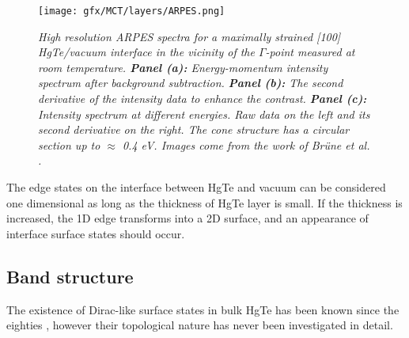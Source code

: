 \documentclass[titlepage,a4paper]{book}
\newcommand{\wciecie}{\quad\phantom{v}}
\begin{document}
\begin{figure}[ht]
	\centering
	\texttt{[image: gfx/MCT/layers/ARPES.png]}
	\vspace{-10pt}
	\caption{\textit{High resolution ARPES spectra for a maximally strained [100] HgTe/vacuum interface in the vicinity of the $\Gamma$-point measured at room temperature. \textbf{Panel (a):} Energy-momentum intensity spectrum after background subtraction. \textbf{Panel (b):} The second derivative of the intensity data to enhance the contrast. \textbf{Panel (c):} Intensity spectrum at different energies. Raw data on the left and its second derivative on the right. The cone structure has a circular section up to $\approx$ 0.4 eV. Images come from the work of Brüne \textit{et al.} \cite{Brune_State2}.}}
	\label{fig:Layers_ARPES}
\end{figure} 

The edge states on the interface between HgTe and vacuum can be considered one dimensional as long as the thickness of HgTe layer is small. If the thickness is increased, the 1D edge transforms into a 2D surface, and an appearance of interface surface states should occur.

\subsection{Band structure}
\wciecie
The existence of Dirac-like surface states in bulk HgTe has been known since the eighties \cite{Dyakonov_MCT_layers}\cite{Chang_MCT_layers}, however their topological nature has never been investigated in detail. 
\end{document}
